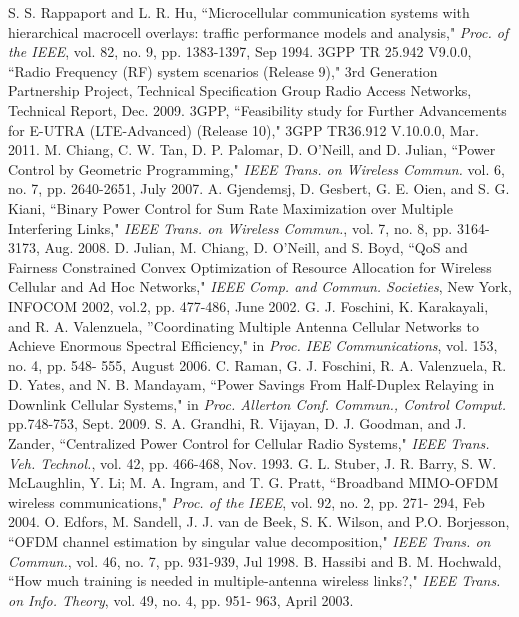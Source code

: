 \documentclass[conference,letterpaper,final,10pt]{IEEEtran}
\begin{document}
\begin{thebibliography}{99}
 S. S. Rappaport and L. R. Hu, ``Microcellular communication systems with hierarchical macrocell overlays: traffic performance models and analysis," \emph{Proc. of the IEEE}, vol. 82, no. 9, pp. 1383-1397, Sep 1994.
 3GPP TR 25.942 V9.0.0, ``Radio Frequency (RF) system scenarios (Release 9)," 3rd Generation Partnership Project, Technical Specification Group Radio Access Networks, Technical Report, Dec. 2009.
 3GPP, ``Feasibility study for Further Advancements for E-UTRA (LTE-Advanced) (Release 10)," 3GPP TR36.912 V.10.0.0, Mar. 2011.
M. Chiang, C. W. Tan, D. P. Palomar, D. O'Neill, and D. Julian, ``Power Control by Geometric Programming," \emph{IEEE Trans. on Wireless Commun.} vol. 6, no. 7, pp. 2640-2651, July 2007.
 A. Gjendemsj, D. Gesbert, G. E. Oien, and S. G. Kiani, ``Binary Power Control for Sum Rate Maximization over Multiple Interfering Links," \emph{IEEE Trans. on Wireless Commun.}, vol. 7, no. 8, pp. 3164-3173, Aug. 2008.
 D. Julian, M. Chiang, D. O'Neill, and S. Boyd, ``QoS and Fairness Constrained Convex Optimization of Resource Allocation for Wireless Cellular and Ad Hoc Networks," \emph{IEEE Comp. and Commun. Societies}, New York, INFOCOM 2002, vol.2, pp. 477-486, June 2002.
 G. J. Foschini, K. Karakayali, and R. A. Valenzuela, ''Coordinating Multiple Antenna Cellular Networks to Achieve Enormous Spectral Efficiency," in \emph{Proc. IEE Communications}, vol. 153, no. 4, pp. 548- 555, August 2006.
 C. Raman, G. J. Foschini, R. A. Valenzuela, R. D. Yates, and N. B. Mandayam, ``Power Savings From Half-Duplex Relaying in Downlink Cellular Systems," in \emph{Proc. Allerton Conf. Commun., Control Comput.} pp.748-753, Sept. 2009.
 S. A. Grandhi, R. Vijayan, D. J. Goodman, and J. Zander, ``Centralized Power Control for Cellular Radio Systems,"
    \emph{IEEE Trans. Veh. Technol.}, vol. 42, pp. 466-468, Nov. 1993.
 G. L. Stuber, J. R. Barry, S. W. McLaughlin, Y. Li; M. A. Ingram, and T. G. Pratt, ``Broadband MIMO-OFDM wireless communications," \emph{Proc. of the IEEE}, vol. 92, no. 2, pp. 271- 294, Feb 2004.
 O. Edfors, M. Sandell, J. J. van de Beek, S. K. Wilson, and P.O. Borjesson, ``OFDM channel estimation by singular value decomposition," \emph{IEEE Trans. on Commun.}, vol. 46, no. 7, pp. 931-939, Jul 1998.
 B. Hassibi and B. M. Hochwald, ``How much training is needed in multiple-antenna wireless links?," \emph{IEEE Trans. on Info. Theory}, vol. 49, no. 4, pp. 951- 963, April 2003.

\end{thebibliography}
\end{document}

